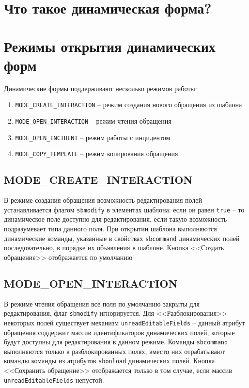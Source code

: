 \documentclass[../index.tex]{subfiles}
\begin{document}
\section{Что такое динамическая форма?}

\section{Режимы открытия динамических форм}
Динамические формы поддерживают несколько режимов работы:

\begin{enumerate}
	\item \verb|MODE_CREATE_INTERACTION| -- режим создания нового обращения из шаблона
	\item \verb|MODE_OPEN_INTERACTION| -- режим чтения обращения
    \item \verb|MODE_OPEN_INCIDENT| -- режим работы с инцидентом
	\item \verb|MODE_COPY_TEMPLATE| -- режим копирования обращения
\end{enumerate}

\subsection{MODE\_CREATE\_INTERACTION}
В режиме создания обращения возможность редактирования полей устанавливается 
флагом \verb|sbmodify| в элементах шаблона: если он равен \verb|true| -- то динамическое поле доступно для редактирования, если такую возможность подразумевает типа данного поля.
При открытии шаблона выполняются динамические команды, указанные в свойствах  \verb|sbcommand| динамических
полей последовательно, в порядке их объявления в шаблоне. Кнопка <<Создать обращение>> отображается по умолчанию
	
\subsection{MODE\_OPEN\_INTERACTION}
В режиме чтения обращения все поля по умолчанию закрыты для редактирования, флаг \verb|sbmodify| игнорируется.
Для <<Разблокирования>> некоторых полей существует механизм \verb|unreadEditableFields| -- данный атрибут обращения соддержит массив идентификаторов динамических полей, которые будут доступны для редактирования в данном режиме. Команды \verb|sbcommand| выполняются только в разблокированных полях, вместо них отрабатывают команды команды из атрибутов \verb|sbonload| динамических полей. Кнопка <<Сохранить обращение>> отображается только в том случае, если массив \verb|unreadEditableFields| непустой.
\end{document}

